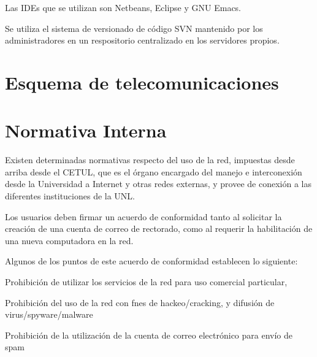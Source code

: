 \documentclass[a4paper,11pt,oneside]{article}
\begin{document}
Las IDEs que se utilizan son Netbeans, Eclipse y GNU Emacs.

Se utiliza el sistema de versionado de código SVN mantenido por los administradores en un respositorio centralizado en los servidores propios.

\section{Esquema de telecomunicaciones}

\section{Normativa Interna}
%
Existen determinadas normativas respecto del uso de la red, impuestas
desde arriba desde el CETUL, que es el órgano encargado del manejo e
interconexión desde la Universidad a Internet y otras redes externas,
y provee de conexión a las diferentes instituciones de la UNL.

Los usuarios deben firmar un acuerdo de conformidad tanto al solicitar
la creación de una cuenta de correo de rectorado, como al requerir la
habilitación de una nueva computadora en la red.

Algunos de los puntos de este acuerdo de conformidad establecen lo
siguiente:
%
\begin{itemize*}
\item Prohibición de utilizar los servicios de la red para uso
  comercial particular,
\item Prohibición del uso de la red con fnes de hackeo/cracking, y
  difusión de virus/spyware/malware
\item Prohibición de la utilización de la cuenta de correo electrónico
  para envío de spam
\end{itemize*}
%
\end{document}
